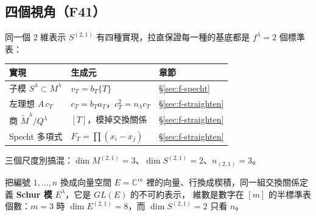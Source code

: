\subsection{四個視角（F41）}\label{sec:f-views}

同一個 2 維表示 $S^{(2,1)}$ 有四種實現，拉直保證每一種的基底都是 $f^\lambda=2$ 個標準表：
\begin{center}
\begin{tabular}{@{}lll@{}}
\toprule
實現 & 生成元 & 章節\\
\midrule
子模 $S^\lambda\subset M^\lambda$ & $v_T=b_T\{T\}$ & \S\ref{sec:f-specht}\\
左理想 $A\,c_T$ & $c_T=b_Ta_T$，$c_T^2=n_\lambda c_T$ & \S\ref{sec:f-straighten}\\
商 $\widetilde M^\lambda/Q^\lambda$ & $[T]$，模掉交換關係 & \S\ref{sec:f-straighten}\\
Specht 多項式 & $F_T=\prod(x_i-x_j)$ & \S\ref{sec:f-straighten}\\
\bottomrule
\end{tabular}
\end{center}
三個尺度別搞混：$\dim M^{(2,1)}=3$、$\dim S^{(2,1)}=2$、$n_{(2,1)}=3$。

\begin{notebox}[預告第 8 章]
把編號 $1,\ldots,n$ 換成向量空間 $E=\mathbb C^m$ 裡的向量、行換成楔積，同一組交換關係定義 \textbf{Schur 模} $E^\lambda$，它是 $GL(E)$ 的不可約表示，
維數是數字在 $[m]$ 的半標準表個數：$m=3$ 時 $\dim E^{(2,1)}=8$，而 $\dim S^{(2,1)}=2$ 只看 $n$。
\end{notebox}

